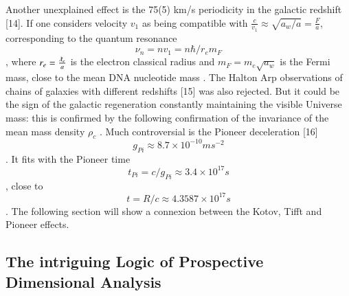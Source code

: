 \documentclass[twoside,draft]{article}
\begin{document}
{Another unexplained effect is the 75(5) km/s periodicity in the galactic redshift [14]. If one considers
velocity $v_{1}$ as being compatible with $\frac{c}{v_{1}} \approx \sqrt{a_{w} /a} = \frac{F}{a}$, corresponding to the quantum resonance $$\nu_{n} = nv_{1} =n\hbar /r_{e} m_{F} $$, where $r_{e} = \frac{\lambdabar_{e}}{a}$ is the electron classical radius and $m_{F} = m_{e}\sqrt{a_{w}}$ is the Fermi mass, close to the mean DNA nucleotide mass \cite{fm1}.
The Halton Arp observations of chains of galaxies with different redshifts [15] was also
rejected. But it could be the sign of the galactic regeneration constantly maintaining the visible
Universe mass: this is confirmed by the following confirmation of the invariance of the mean mass
density $\rho_{c}$ .
Much controversial is the Pioneer deceleration [16] $$g_{Pi} \approx 8.7 \times 10^{-10} ms^{-2}$$. It fits with
the Pioneer time $$t_{Pi} = c/g_{Pi} \approx 3.4 \times 10^{17} s$$, close to $$t = R/c \approx 4.3587 \times 10^{17} s$$. The following section will show a connexion between the Kotov, Tifft and Pioneer effects.

\subsection{The intriguing Logic of Prospective Dimensional Analysis}

}
\end{document}
